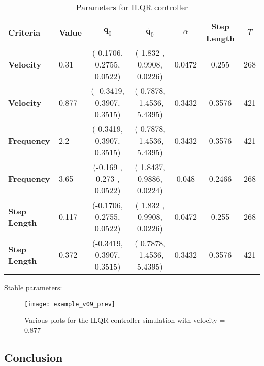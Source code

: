 \renewcommand{\arraystretch}{1.}
\begin{table}[!t]
	\centering    
      \caption{Parameters for ILQR controller}
      \label{tab:ilqr_result}
		
	\begin{tabular}{l l | c  c  c c c}
		\toprule
\bf{Criteria} & \bf{Value} & $\bm{q}_0$ & $\dot{\bm{q}_0}$ & $\alpha$ &  \bf{Step Length} & $T$ \\
\bf{Velocity} & 0.31 & (-0.1706,  0.2755,  0.0522) & (  1.832 ,  0.9908,  0.0226) &   0.0472 & 0.255 & 268 \\
\bf{Velocity} & 0.877 &( -0.3419,  0.3907,  0.3515) & (  0.7878, -1.4536,  5.4395) &   0.3432&       0.3576 &421\\
\bf{Frequency} & 2.2 & (-0.3419,  0.3907,  0.3515) & ( 0.7878, -1.4536,  5.4395) &   0.3432&0.3576 &421  \\
\bf{Frequency} & 3.65 & (-0.169 ,  0.273 ,  0.0522) & (  1.8437,  0.9886,  0.0224) &   0.048 &        0.2466 &268 \\
\bf{Step Length} & 0.117 &(-0.1706,  0.2755,  0.0522) & (  1.832 ,  0.9908,  0.0226) &  0.0472& 0.255& 268\\
\bf{Step Length} & 0.372 &(-0.3419,  0.3907,  0.3515) & (  0.7878, -1.4536,  5.4395) &   0.3432& 0.3576& 421 
	\end{tabular}
\end{table}

Stable parameters:


\begin{figure}
\texttt{[image: example\_v09\_prev]}
\caption{Various plots for the ILQR controller simulation with velocity = 0.877}
\label{fig:ilqr_plot}
\end{figure}

\subsection{Conclusion}
\label{sec:conclusion}

